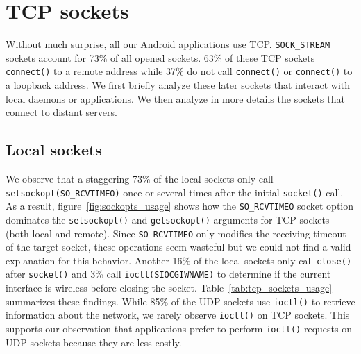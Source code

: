 \section{TCP sockets}\label{sec:tcp}

Without much surprise, all our Android applications use TCP.
\texttt{SOCK\_STREAM} sockets account for 73\% of all opened
sockets. 63\% of these TCP sockets \texttt{connect()} to a remote
address while 37\% do not call \texttt{connect()} or \texttt{connect()}
to a loopback address. We first briefly analyze these later sockets
that interact with local daemons or applications. We then
analyze in more details the sockets that connect to distant servers.

\subsection{Local sockets}

We observe that a staggering 73\% of the local sockets only call
\texttt{setsockopt(SO\_RCVTIMEO)} once or several times after the initial
\texttt{socket()} call. As a result, figure~\ref{fig:sockopts_usage} shows how
the \texttt{SO\_RCVTIMEO} socket option dominates the \texttt{setsockopt()} and
\texttt{getsockopt()} arguments for TCP sockets (both local and remote). Since
\texttt{SO\_RCVTIMEO} only modifies the receiving timeout of the target socket,
these operations seem wasteful but we could not find a valid explanation for
this behavior. Another 16\% of the local sockets only call \texttt{close()}
after \texttt{socket()} and 3\% call \texttt{ioctl(SIOCGIWNAME)} to determine
if the current interface is wireless before closing the socket.
Table~\ref{tab:tcp_sockets_usage} summarizes these findings. While 85\% of the
UDP sockets use \texttt{ioctl()} to retrieve information about the network, we
rarely observe \texttt{ioctl()} on TCP sockets. This supports our
observation that applications prefer to perform \texttt{ioctl()} requests
on UDP sockets because they are less costly.

